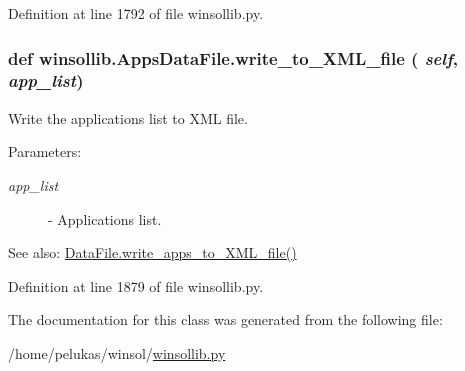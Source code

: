 Definition at line 1792 of file winsollib.py.\hypertarget{classwinsollib_1_1AppsDataFile_03308e0dfa313b1163d8cbafd77a8353}{
\subsubsection[write\_\-to\_\-XML\_\-file]{\setlength{\rightskip}{0pt plus 5cm}def winsollib.Apps\-Data\-File.write\_\-to\_\-XML\_\-file ( {\em self},  {\em app\_\-list})}}
\label{classwinsollib_1_1AppsDataFile_03308e0dfa313b1163d8cbafd77a8353}


Write the applications list to XML file. 

\begin{Desc}
\item[Parameters:]
\begin{description}
\item[{\em app\_\-list}]- Applications list.\end{description}
\end{Desc}
\begin{Desc}
\item[See also:]\hyperlink{classwinsollib_1_1DataFile_ec7a45f4fc3069f7da870bc41e27963f}{Data\-File.write\_\-apps\_\-to\_\-XML\_\-file()} \end{Desc}


Definition at line 1879 of file winsollib.py.

The documentation for this class was generated from the following file:\begin{CompactItemize}
\item 
/home/pelukas/winsol/\hyperlink{winsollib_8py}{winsollib.py}\end{CompactItemize}
